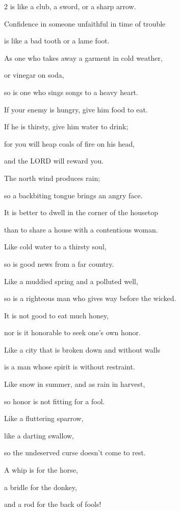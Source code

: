 \begin{multicols}{2}
is like a club, a sword, or a sharp arrow.


\myverse{}Confidence in someone unfaithful in time of trouble

is like a bad tooth or a lame foot.


\myverse{}As one who takes away a garment in cold weather,

or vinegar on soda,

so is one who sings songs to a heavy heart.


\myverse{}If your enemy is hungry, give him food to eat.

If he is thirsty, give him water to drink;


\myverse{}for you will heap coals of fire on his head,

and the LORD will reward you.


\myverse{}The north wind produces rain;

so a backbiting tongue brings an angry face.


\myverse{}It is better to dwell in the corner of the housetop

than to share a house with a contentious woman.


\myverse{}Like cold water to a thirsty soul,

so is good news from a far country.


\myverse{}Like a muddied spring and a polluted well,

so is a righteous man who gives way before the wicked.


\myverse{}It is not good to eat much honey,

nor is it honorable to seek one’s own honor.


\myverse{}Like a city that is broken down and without walls

is a man whose spirit is without restraint.


\mychapter{} \myverse*{}Like snow in summer, and as rain in harvest,

\quad\quad so honor is not fitting for a fool.


\myverse{}Like a fluttering sparrow,

like a darting swallow,

so the undeserved curse doesn’t come to rest.


\myverse{}A whip is for the horse,

a bridle for the donkey,

and a rod for the back of fools!



\end{multicols}
